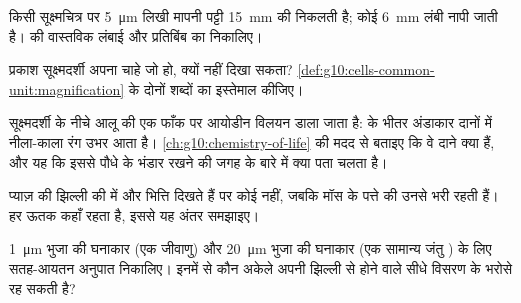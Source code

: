 \begin{exercise}[$\star\star$]\label{exo:g10:cells-common-unit:6}
किसी सूक्ष्मचित्र पर \qty{5}{\micro m} लिखी मापनी पट्टी \qty{15}{mm} की
निकलती है; कोई  \qty{6}{mm} लंबी नापी जाती है।  की
वास्तविक लंबाई और प्रतिबिंब का  निकालिए।
\end{exercise}

\begin{exercise}[$\star\star$]\label{exo:g10:cells-common-unit:7}
प्रकाश सूक्ष्मदर्शी अपना  चाहे जो हो,  क्यों नहीं दिखा
सकता? \cref{def:g10:cells-common-unit:magnification} के दोनों शब्दों का
इस्तेमाल कीजिए।
\end{exercise}

\begin{exercise}[$\star\star$]\label{exo:g10:cells-common-unit:8}
सूक्ष्मदर्शी के नीचे आलू की एक फाँक पर आयोडीन विलयन डाला जाता है:
 के भीतर अंडाकार दानों में नीला-काला रंग उभर आता है।
\cref{ch:g10:chemistry-of-life} की मदद से बताइए कि वे दाने क्या हैं, और
यह कि इससे पौधे के भंडार रखने की जगह के बारे में क्या पता चलता है।
\end{exercise}

\begin{exercise}[$\star\star$]\label{exo:g10:cells-common-unit:9}
प्याज़ की झिल्ली की  में  और भित्ति दिखते हैं पर 
कोई नहीं, जबकि मॉस के पत्ते की  उनसे भरी रहती हैं। हर ऊतक कहाँ
रहता है, इससे यह अंतर समझाइए।
\end{exercise}

\begin{exercise}[$\star\star$]\label{exo:g10:cells-common-unit:10}
\qty{1}{\micro m} भुजा की घनाकार  (एक जीवाणु) और \qty{20}{\micro m}
भुजा की घनाकार  (एक सामान्य जंतु ) के लिए सतह-आयतन अनुपात
निकालिए। इनमें से कौन अकेले अपनी झिल्ली से होने वाले सीधे विसरण के भरोसे
रह सकती है?
\end{exercise}

